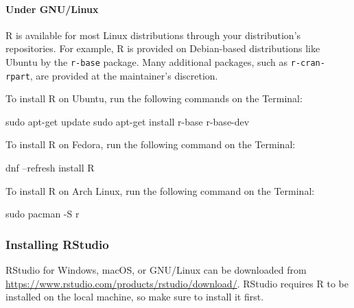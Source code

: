 \documentclass[]{scrartcl}
\newenvironment{Shaded}{\begin{snugshade}}{\end{snugshade}}
\newcommand{\ExtensionTok}[1]{#1}
\newcommand{\FunctionTok}[1]{\textcolor[rgb]{0.00,0.00,0.00}{#1}}
\newcommand{\NormalTok}[1]{#1}
\let\oldparagraph\paragraph
\renewcommand{\paragraph}[1]{\oldparagraph{#1}\mbox{}}
\begin{document}
\hypertarget{under-gnulinux}{%
\paragraph{Under GNU/Linux}\label{under-gnulinux}}

R is available for most Linux distributions through your distribution's repositories. For example, R is provided on Debian-based distributions like Ubuntu by the \texttt{r-base} package. Many additional packages, such as \texttt{r-cran-rpart}, are provided at the maintainer's discretion.

To install R on Ubuntu, run the following commands on the Terminal:

\begin{Shaded}
\begin{Highlighting}[]
\FunctionTok{sudo}\NormalTok{ apt-get update}
\FunctionTok{sudo}\NormalTok{ apt-get install r-base r-base-dev}
\end{Highlighting}
\end{Shaded}

To install R on Fedora, run the following command on the Terminal:

\begin{Shaded}
\begin{Highlighting}[]
\ExtensionTok{dnf}\NormalTok{ --refresh install R}
\end{Highlighting}
\end{Shaded}

To install R on Arch Linux, run the following command on the Terminal:

\begin{Shaded}
\begin{Highlighting}[]
\FunctionTok{sudo}\NormalTok{ pacman -S r}
\end{Highlighting}
\end{Shaded}

\hypertarget{installing-rstudio}{%
\subsubsection{Installing RStudio}\label{installing-rstudio}}

RStudio for Windows, macOS, or GNU/Linux can be downloaded from \href{https://www.rstudio.com/products/rstudio/download/\#download}{https://www.rstudio.com/products/rstudio/download/}. RStudio requires R to be installed on the local machine, so make sure to install it first.
\end{document}
